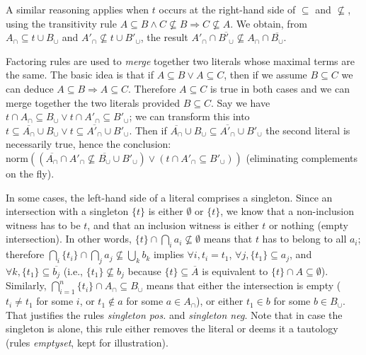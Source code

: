 \documentclass{article}
\newcommand{\compl}[1]{\ensuremath{\overline{#1}}}
\newcommand{\normalize}[1]{\ensuremath{\text{norm}(#1)}}
\begin{document}
A similar reasoning applies when $t$ occurs at the right-hand side of
$\subseteq$ and $\not\subseteq$, using the transitivity rule
$A \subseteq B \land C \not\subseteq B \Rightarrow C \not\subseteq A$. We
obtain, from $A_\cap \subseteq t\cup B_\cup$ and
$A'_\cap \not\subseteq t\cup B'_\cup$, the result
$A'_\cap \cap \compl{B'_\cup} \not\subseteq A_\cap \cap \compl{B_\cup}$.

Factoring rules are used to \emph{merge} together two literals whose maximal
terms are the same. The basic idea is that if $A \subseteq B
\lor A \subseteq C$, then if we assume $B\subseteq C$ we can deduce
$A \subseteq B \Rightarrow A \subseteq C$. Therefore $A\subseteq C$ is true
in both cases and we can merge together the two literals provided $B\subseteq C$.
Say we have
$t \cap A_\cap \subseteq B_\cup \lor t \cap A'_\cap \subseteq B'_\cup$; we
can transform this into
$t \subseteq \compl{A_\cap} \cup B_\cup \lor t \subseteq \compl{A'_\cap} \cup B'_\cup$.
Then if $\compl{A_\cap} \cup B_\cup \subseteq \compl{A'_\cap} \cup B'_\cup$
the second literal is necessarily true, hence the conclusion:
$\normalize{(\compl{A_\cap} \cap A'_\cap \not\subseteq \compl{B_\cup} \cup B'_\cup) 
    \lor (t \cap A'_\cap \subseteq B'_\cup)}$ (eliminating complements
on the fly).

In some cases, the left-hand side of a literal comprises
a singleton. Since an intersection with a singleton $\{ t \}$ is either
$\emptyset$ or $\{ t\}$, we know that a non-inclusion witness has to be $t$,
and that an inclusion witness is either $t$ or nothing (empty intersection).
In other words, $\{ t \} \cap \bigcap_i a_i \not\subseteq \emptyset$
means that $t$ has to belong to all $a_i$; therefore
$\bigcap_i \{ t_i \} \cap \bigcap_j a_j \not\subseteq \bigcup_k b_k$
implies $\forall i, t_i = t_1$,
$\forall j, \{ t_1 \} \subseteq a_j$, and
$\forall k, \{ t_1 \} \subseteq \compl{b_j}$ (i.e.,
$\{ t_1 \} \not\subseteq b_j$ because $\{ t\} \subseteq \compl{A}$
is equivalent to $\{t \} \cap A \subseteq \emptyset$). Similarly,
$\bigcap_{i=1}^n \{ t_i \} \cap A_\cap \subseteq B_\cup$ means that
either the intersection is empty ($t_i \not= t_1$ for some $i$,
or $t_1 \not\in a$ for some $a \in A_\cap$), or either
$t_1 \in b$ for some $b \in B_\cup$.
That justifies the rules \emph{singleton pos.} and \emph{singleton neg}. Note
that in case the singleton is alone, this rule either removes the
literal or deems it a tautology (rules \emph{emptyset}, kept for
illustration).
\end{document}
